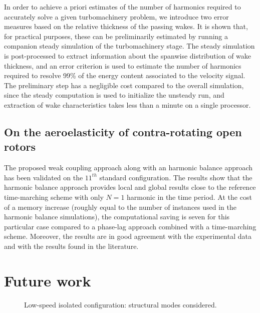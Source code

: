 In order to achieve a priori estimates of the number of 
harmonics required to accurately solve a given turbomachinery 
problem, we introduce two error measures based on the relative 
thickness of the passing wakes. It is shown that, for practical 
purposes, these can be preliminarily estimated by running a 
companion steady simulation of the turbomachinery stage. The 
steady simulation is post-processed to extract information about 
the spanwise distribution of wake thickness, and an error criterion 
is used to estimate the number of harmonics required to resolve 99\% 
of the energy content associated to the velocity signal. The 
preliminary step has a negligible cost compared to the overall 
simulation, since the steady computation is used to initialize 
the unsteady run, and extraction of wake characteristics takes 
less than a minute on a single processor. 

\subsection*{On the aeroelasticity of contra-rotating open rotors}

The proposed weak coupling approach along with
an harmonic balance approach has been
validated on the $11^{th}$ standard configuration. 
The results show that the harmonic balance approach provides local
and global results close to the reference time-marching scheme 
with only $N=1$ harmonic in the time period. At the cost of a memory
increase (roughly equal to the number of instances used in the harmonic balance
simulations), the computational saving is seven for this
particular case compared to a phase-lag approach combined
with a time-marching scheme. 
Moreover, the results are
in good agreement with the experimental data and with the results
found in the literature.





\section*{Future work}

\begin{figure}[htp]
  \centering
  \caption{Low-speed isolated configuration: structural modes considered.}
  \label{fig:hera3_perspectives}
\end{figure}
